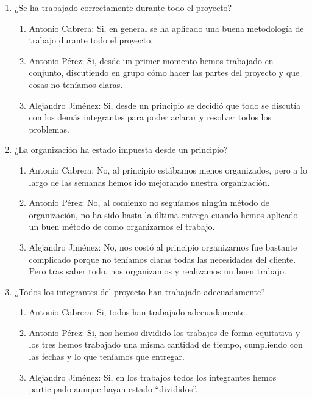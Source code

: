 \begin{enumerate}
    \item ¿Se ha trabajado correctamente durante todo el proyecto?
    \begin{enumerate}
        \item Antonio Cabrera: Si, en general se ha aplicado una buena metodología de trabajo durante todo el proyecto.
        \item Antonio Pérez: Si, desde un primer momento hemos trabajado en conjunto, discutiendo en grupo cómo hacer las partes del proyecto y que cosas no teníamos claras.
        \item Alejandro Jiménez: Si, desde un principio se decidió que todo se discutía con los demás integrantes para poder aclarar y resolver todos los problemas.
 
    \end{enumerate}
    \item ¿La organización ha estado impuesta desde un principio?
        \begin{enumerate}
            \item Antonio Cabrera: No, al principio estábamos menos organizados, pero a lo largo de las semanas hemos ido mejorando nuestra organización.
            \item Antonio Pérez: No, al comienzo no seguíamos ningún método de organización, no ha sido hasta la última entrega cuando hemos aplicado un buen método de como organizarnos el trabajo.
            \item Alejandro Jiménez: No, nos costó al principio organizarnos fue bastante complicado porque no teníamos claras todas las necesidades del cliente. Pero tras saber todo, nos organizamos y realizamos un buen trabajo.
        \end{enumerate}

    \item ¿Todos los integrantes del proyecto han trabajado adecuadamente?
    \begin{enumerate}
        \item Antonio Cabrera: Si, todos han trabajado adecuadamente.
        \item Antonio Pérez: Si, nos hemos dividido los trabajos de forma equitativa y los tres hemos trabajado una misma cantidad de tiempo, cumpliendo con las fechas y lo que teníamos que entregar.
        \item Alejandro Jiménez: Si, en los trabajos todos los integrantes hemos participado aunque hayan estado “divididos”.
    \end{enumerate}


\end{enumerate}
